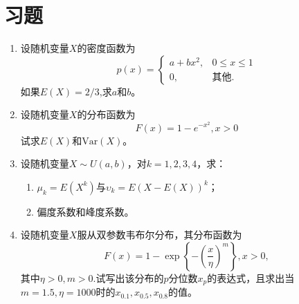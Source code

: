 \section{习题}

    \begin{enumerate}
        \item 设随机变量$X$的密度函数为
$$ p(x) = \begin{cases}
a + bx^2, & 0\leq x\leq 1\\
0, & \text{其他}.
\end{cases}
$$
如果$E(X) = 2/3$,求$a$和$b$。

\item 设随机变量$X$的分布函数为
$$
	    F(x) = 1- e^{-x^2},x > 0
$$
试求$E(X)$和$\text{Var}(X)$。

\item 设随机变量$X \sim U(a,b)$，对$k = 1,2,3,4$，求：
\begin{enumerate}
    \item $\mu_k = E(X^k)$与$\upsilon_k = E(X - E(X))^k$；
    \item 偏度系数和峰度系数。
\end{enumerate}

\item 设随机变量$X$服从双参数韦布尔分布，其分布函数为
$$
	    F(x) = 1-\exp \left \{-\left (\frac{x}{\eta} \right )^m \right \}, x>0,
$$
其中$\eta > 0,m > 0$.试写出该分布的$p$分位数$x_p$的表达式，且求出当$m = 1.5,\eta = 1000$时的$x_{0.1},x_{0.5},x_{0.8}$的值。
 

\end{enumerate}
